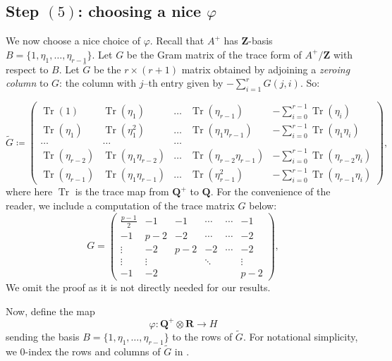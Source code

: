 \documentclass{amsart}
\newcommand{\QQ}{\mathbf{Q}}
\newcommand{\ZZ}{\mathbf{Z}}
\newcommand{\RR}{\mathbf{R}}
\DeclareMathOperator{\Tr}{Tr}
\newcommand{\vect}[1]{\begin{pmatrix}#1\end{pmatrix}}
\numberwithin{equation}{section}
\begin{document}
\subsection{Step $(5)$: choosing a nice $\varphi$}
\label{subsec:phi-choice}
We now choose a nice choice of $\varphi$. Recall that $A^+$ has $\ZZ$-basis $B = \{1,\eta_1,\dots,\eta_{r-1}\}$. Let $G$ be the Gram matrix of the trace form of $A^+/\ZZ$ with respect to $B$. Let $\widetilde{G}$ be the $r\times (r+1)$ matrix obtained by adjoining a \emph{zeroing column} to $G$: the column with $j$--th entry given by $-\sum_{i=1}^{r} G(j,i)$. So:

\[
	\widetilde{G} \coloneqq	\begin{pmatrix}
				\Tr(1)	& \Tr(\eta_1)	& \dots & \Tr(\eta_{r-1}) &	-\sum_{i = 0}^{r-1}\Tr(\eta_i)	\\
                \Tr(\eta_{1}) & \Tr(\eta_1^2)	&\dots & \Tr(\eta_1 \eta_{r-1} )& -\sum_{i = 0}^{r-1}\Tr(\eta_{1}\eta_i) \\
                \dots	& \dots &	\dots	\\
                \Tr(\eta_{r-2}) & \Tr(\eta_1 \eta_{r-2})	&\dots & \Tr(\eta_{r-2}\eta_{r-1} )& -\sum_{i = 0}^{r-1}\Tr(\eta_{r-2}\eta_i) \\
                
				\Tr(\eta_{r-1}) & \Tr(\eta_1 \eta_{r-1})	&\dots & \Tr(\eta_{r-1}^2 )& -\sum_{i = 0}^{r-1}\Tr(\eta_{r-1}\eta_i)
			\end{pmatrix},
\]
where here $\Tr$ is the trace map from $\QQ^+$ to $\QQ$. For the convenience of the reader, we include a computation of the trace matrix $G$ below:
\[
		G = \vect{\frac{p-1}{2} & -1 & -1 & \cdots & \cdots &-1\\
			-1 &p-2&-2&\cdots& \cdots &-2\\
			\vdots&-2&p-2&-2& \cdots &-2\\
			\vdots&\vdots&&\ddots&&\vdots\\
			-1&-2&&&&p-2},
\]
We omit the proof as it is not directly needed for our results.

Now, define the map
\[
    \varphi \colon \QQ^+ \otimes \RR \rightarrow H
\]
sending the basis $B = \{1,\eta_1,\dots,\eta_{r-1}\}$ to the rows of $\widetilde{G}$. For notational simplicity, we $0$-index the rows and columns of $\widetilde{G}$ in . 
\end{document}
